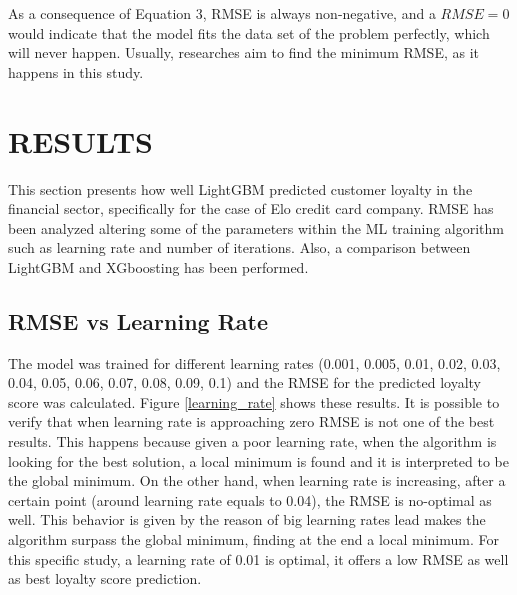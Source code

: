 \documentclass[letterpaper, 10 pt, conference]{ieeeconf}  %
\begin{document}
As a consequence of Equation 3, RMSE is always non-negative, and a $RMSE=0$ would indicate that the model fits the data set of the problem perfectly, which will never happen. Usually, researches aim to find the minimum RMSE, as it happens in this study.\\

\section{RESULTS}
This section presents how well LightGBM predicted customer loyalty in the financial sector, specifically for the case of Elo credit card company. RMSE has been analyzed altering some of the parameters within the ML training algorithm such as learning rate and number of iterations. Also, a comparison between LightGBM and XGboosting has been performed.

\subsection{RMSE vs Learning Rate}
The model was trained for different learning rates (0.001, 0.005, 0.01, 0.02, 0.03, 0.04, 0.05, 0.06, 0.07, 0.08, 0.09, 0.1) and the RMSE for the predicted loyalty score was calculated. Figure \ref{learning_rate} shows these results. It is possible to verify that when learning rate is approaching zero RMSE is not one of the best results. This happens because given a poor learning rate, when the algorithm is looking for the best solution, a local minimum is found and it is interpreted to be the global minimum. On the other hand, when learning rate is increasing, after a certain point (around learning rate equals to 0.04), the RMSE is no-optimal as well. This behavior is given by the reason of big learning  rates lead makes the algorithm surpass the global minimum, finding at the end a local minimum. For this specific study, a learning rate of 0.01 is optimal, it offers a low RMSE as well as best loyalty score prediction.
\end{document}
